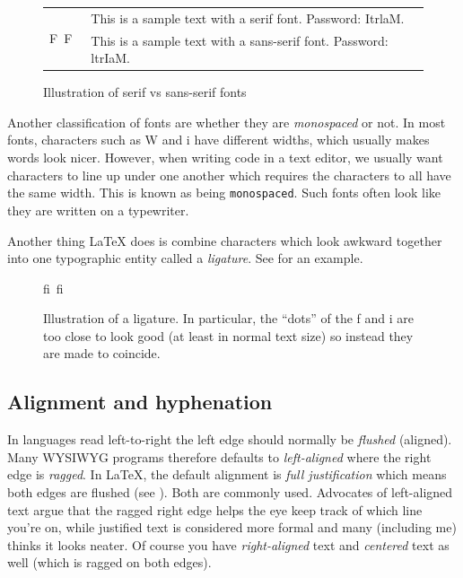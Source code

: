 {\begin{figure}
	\centering
	\begin{tabular}{ll}
		\multirow{2}{*}{\noindent\hfill{\Huge F}~{\Huge \textsf{F}}\hfill~}	
		&	This is a sample text with a serif font. Password: ItrlaM.	\\
		&	\textsf{This is a sample text with a sans-serif font. Password: ltrIaM.}
	\end{tabular}
	\caption{Illustration of serif vs sans-serif fonts}
	\label{fig:latex:serif}
\end{figure}

Another classification of fonts are whether they are \emph{monospaced} or not. In most fonts, characters such as W and i have different widths, which usually makes words look nicer. However, when writing code in a text editor, we usually want characters
to line up under one another which requires the characters to all have the same width. This is known as being \texttt{monospaced}. Such fonts often look like they are written on a typewriter.

Another thing \LaTeX{} does is combine characters which look awkward together into one typographic entity called a \emph{ligature}. See  for an example.


\begin{figure}
	\centering
	{\Huge f{}i}~{\Huge fi}
	\caption{Illustration of a ligature. In particular, the ``dots'' of the f and i are too close to look good (at least in normal text size) so instead they are made to coincide.}
	\label{fig:latex:ligature}
\end{figure}	

\subsection{Alignment and hyphenation}
In languages read left-to-right the left edge should normally be \emph{flushed} (aligned). Many WYSIWYG programs therefore defaults to \emph{left-aligned} where the right edge is \emph{ragged}. In \LaTeX{}, the default alignment is \emph{full justification} which means both edges are flushed (see ). Both are commonly used. Advocates of left-aligned text argue that the ragged right edge helps the eye keep track of which line you're on, while justified text is considered more formal and many (including me) thinks it looks neater. Of course you have \emph{right-aligned} text and \emph{centered} text as well (which is ragged on both edges).

}
